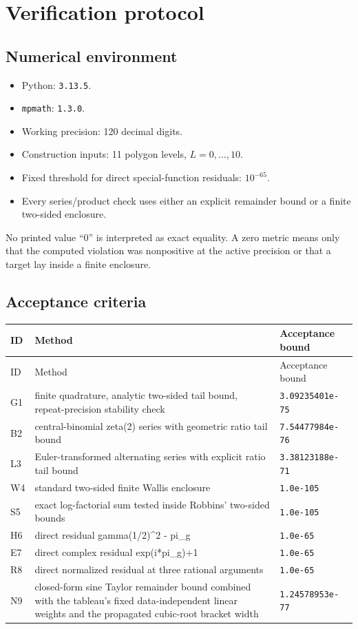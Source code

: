 \documentclass[11pt]{article}
\begin{document}
\section{Verification protocol}

\subsection{Numerical environment}

\begin{itemize}[leftmargin=2em]
\item Python: \texttt{3.13.5}.
\item \texttt{mpmath}: \texttt{1.3.0}.
\item Working precision: 120 decimal digits.
\item Construction inputs: 11 polygon levels, $L=0,\ldots,10$.
\item Fixed threshold for direct special-function residuals: $10^{-65}$.
\item Every series/product check uses either an explicit remainder bound or a finite two-sided enclosure.
\end{itemize}

No printed value ``0'' is interpreted as exact equality.  A zero metric means only that the computed violation was nonpositive at the active precision or that a target lay inside a finite enclosure.

\subsection{Acceptance criteria}

\begin{longtable}{p{} p{} p{}}
\toprule
ID & Method & Acceptance bound \\
\midrule
\endfirsthead
\toprule
ID & Method & Acceptance bound \\
\midrule
\endhead
G1 & finite quadrature, analytic two-sided tail bound, repeat-precision stability check & \texttt{3.09235401e-75} \\
B2 & central-binomial zeta(2) series with geometric ratio tail bound & \texttt{7.54477984e-76} \\
L3 & Euler-transformed alternating series with explicit ratio tail bound & \texttt{3.38123188e-71} \\
W4 & standard two-sided finite Wallis enclosure & \texttt{1.0e-105} \\
S5 & exact log-factorial sum tested inside Robbins' two-sided bounds & \texttt{1.0e-105} \\
H6 & direct residual gamma(1/2)\textasciicircum{}2 - pi\_g & \texttt{1.0e-65} \\
E7 & direct complex residual exp(i*pi\_g)+1 & \texttt{1.0e-65} \\
R8 & direct normalized residual at three rational arguments & \texttt{1.0e-65} \\
N9 & closed-form sine Taylor remainder bound combined with the tableau's fixed data-independent linear weights and the propagated cubic-root bracket width & \texttt{1.24578953e-77} \\
\bottomrule
\end{longtable}
\end{document}
